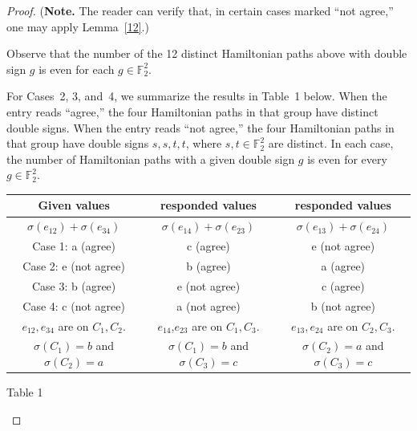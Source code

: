 \documentclass[12pt]{amsart}
\theoremstyle{plain}
\theoremstyle{definition}%
\begin{document}
\begin{proof}
(\textbf{Note.} The reader can verify that, in certain cases marked ``not agree,'' one may apply Lemma~\ref{12}.)


Observe that the number of the 12 distinct Hamiltonian paths above with double sign $g$ is
even for each $g\in \mathbb{F}_2^2$.







For Cases~2, 3, and~4, we summarize the results in Table~1 below.  
When the entry reads “agree,” the four Hamiltonian paths in that group have distinct double signs.  
When the entry reads “not agree,” the four Hamiltonian paths in that group have double signs \(s,s,t,t\),  
where \(s,t \in \mathbb{F}_2^2\) are distinct.  
In each case, the number of Hamiltonian paths with a given double sign \(g\) is even for every \(g \in \mathbb{F}_2^2\).





\begin{center}
\begin{tabular}{||c| c| c ||} 
 \hline
Given values & responded values & responded  values  \\ [0.5ex] 
 \hline
 $\sigma(e_{12})+\sigma(e_{34})$ & $\sigma(e_{14})+\sigma(e_{23})$ & $\sigma(e_{13})+\sigma(e_{24})$  \\ 
 
 \hline\hline
 Case 1:  a (agree)& c (agree)& e (not agree)\\
 \hline
 Case 2: e (not agree)& b (agree)& a (agree) \\
 \hline
Case 3: b (agree)& e (not agree)& c (agree)\\
 \hline
Case 4:  c (not agree)& a (not agree)& b (not agree)\\ [1ex] 
 \hline \hline
 $e_{12},e_{34}$ are on $C_1,C_2$.  & $e_{14}$,$e_{23}$ are on $C_1,C_3$.& $e_{13},e_{24}$ are on $C_2,C_3$.\\ [1ex] 
  $\sigma(C_1)=b$ and $\sigma(C_2)=a$ & $\sigma(C_1)=b$ and $\sigma(C_3)=c$& $\sigma(C_2)=a$ and $\sigma(C_3)=c$\\ [1ex] 

 
  \hline
\end{tabular}
\end{center}
\begin{center}
    Table 1
\end{center}
\end{proof}
\end{document}
